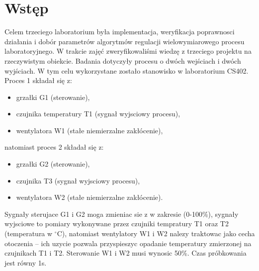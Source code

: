 \chapter{Wstęp}
Celem trzeciego laboratorium była implementacja, weryfikacja poprawnosci działania i dobór parametrów
algorytmów regulacji wielowymiarowego procesu laboratoryjnego. W trakcie zajęć zweryfikowaliśmi wiedzę z trzeciego projektu na rzeczywistym
obiekcie. Badania dotyczyły procesu o dwóch wejściach i dwóch wyjściach. W tym celu wykorzystane zostało stanowisko w laboratorium CS402. Proces 1 składał się z:
\begin{itemize}
  \item grzałki G1 (sterowanie),
  \item czujnika temperatury T1 (sygnał wyjsciowy procesu),
  \item wentylatora W1 (stałe niemierzalne zakłócenie),
\end{itemize}
natomiast proces 2 składał się z:
\begin{itemize}
  \item grzałki G2 (sterowanie),
  \item czujnika T3 (sygnał wyjsciowy procesu),
  \item wentylatora W2 (stałe niemierzalne zakłócenie).
\end{itemize}
Sygnały sterujace G1 i G2 moga zmieniac sie z w zakresie (0-100\%), sygnały wyjsciowe
to pomiary wykonywane przez czujniki tempratury T1 oraz T2 (temperatura w $^\circ$C), natomiast wentylatory W1 i W2 nalezy traktowac jako cecha otoczenia – ich uzycie pozwala
przyspieszyc opadanie temperatury zmierzonej na czujnikach T1 i T2. Sterowanie W1 i W2 musi wynosic 50\%. Czas próbkowania jest równy 1s.
